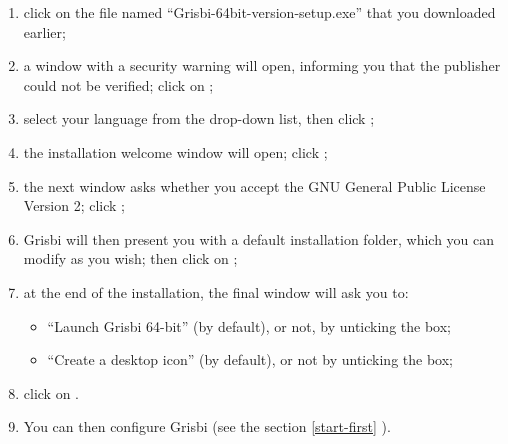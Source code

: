 \begin{enumerate}
	\item click on the file named \enquote{Grisbi-64bit-version-setup.exe} that you downloaded earlier;
	\item a window with a security warning will open, informing you that the publisher could not be verified; click on ;
	\item select your language from the drop-down list, then click ;
	\item the installation welcome window will open; click ;
	\item the next window asks whether you accept the \gls{GNU General Public License} Version 2; click ;
	\item Grisbi will then present you with a default installation folder, which you can modify as you wish; then click on ;
	\item at the end of the installation, the final window will ask you to:
	\begin{itemize}
		\item \enquote{Launch Grisbi 64-bit} (by default), or not, by unticking the box;
		\item \enquote{Create a desktop icon} (by default), or not by unticking the box;
	\end{itemize}
	\item click on .
	\item You can then configure Grisbi (see the section \vref{start-first} ).
\end{enumerate}

